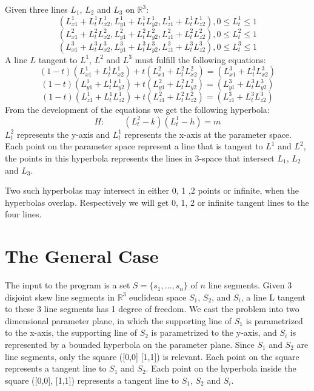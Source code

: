 \documentclass[11pt]{article}
\newenvironment{proof}[1][Proof:]{\begin{trivlist}
\item[\hskip \labelsep {\bfseries #1}]}{\end{trivlist}}
\begin{document}
\begin{proof}
Given three lines $L_1$, $L_2$ and $L_3$ on $\mathbb{R}^3$:
\[
{(L^1_{x1} + L^1_{t}L^1_{x2}, L^1_{y1} + L^1_{t}L^1_{y2}, L^1_{z1} + 
L^1_{t}L^1_{z2}), 0 \leq L^1_t \leq 1}
\]
\[
{(L^2_{x1} + L^2_{t}L^2_{x2}, L^2_{y1} + L^2_{t}L^2_{y2}, L^2_{z1} + 
L^2_{t}L^2_{z2}), 0 \leq L^2_t \leq 1}
\]
\[
{(L^3_{x1} + L^3_{t}L^3_{x2}, L^3_{y1} + L^3_{t}L^3_{y2}, L^3_{z1} + 
L^3_{t}L^3_{z2}), 0 \leq L^3_t \leq 1}
\]
\newline
A line $L$ tangent to $L^1$, $L^2$ and $L^3$ must fulfill the following equations:
\[
(1-t)(L^1_{x1} + L^1_{t}  L^1_{x2}) + t(L^2_{x1} + L^2_{t}  L^2_{x2}) = 
(L^3_{x1} + L^3_{t}  L^3_{x2})
\]
\[
(1-t)(L^1_{y1} + L^1_{t}  L^1_{y2}) + t(L^2_{y1} + L^2_{t}  L^2_{y2}) = 
(L^3_{y1} + L^3_{t}  L^3_{y2})
\]
\[
(1-t)(L^1_{z1} + L^1_{t}  L^1_{z2}) + t(L^2_{z1} + L^2_{t}  L^2_{z2}) = 
(L^3_{z1} + L^3_{t}  L^3_{z2})
\]
\newline
From the development of the equations we get the following hyperbola:
\[
H:\>\>\>\>\>\>\>\>\>\> (L^2_{t} - k)(L^1_t - h) = m
\]
$L^2_t$ represents the y-axis and $L^1_t$ represents the x-axis at the parameter 
space. Each point on the parameter space represent a line that is tangent to
$L^1$ and $L^2$, the points in this hyperbola represents the lines in 3-space 
that intersect $L_1$, $L_2$ and $L_3$.
\end{proof}

Two such hyperbolas may intersect in either 0, 1 ,2 points or infinite,
when the hyperbolas overlap. Respectively we will get 0, 1, 2 or infinite 
tangent lines to the four lines.

\section{The General Case}
\label{sec:general}
The input to the program is a set $S=\{s_1,\ldots,s_n\}$ of $n$ line segments.
\newline
Given 3 disjoint skew line segments in $\mathbb{R}^3$ euclidean space $S_1$, $S_2$, and 
$S_i$, a line L tangent to these 3 line segments has 1 degree of freedom.\newline
We cast the problem into two dimensional parameter plane, in which the supporting
line of $S_1$ is parametrized to the x-axis, the supporting line of $S_2$ is
parametrized to the y-axis, and $S_i$ is represented by a bounded hyperbola on 
the parameter plane.
Since $S_1$ and $S_2$ are line segments, only the square ([0,0] [1,1]) is 
relevant. Each point on the square represents a tangent line to $S_1$ and $S_2$.
Each point on the hyperbola inside the square ([0,0], [1,1]) represents a
tangent line to $S_1$, $S_2$ and $S_i$.
\end{document}
